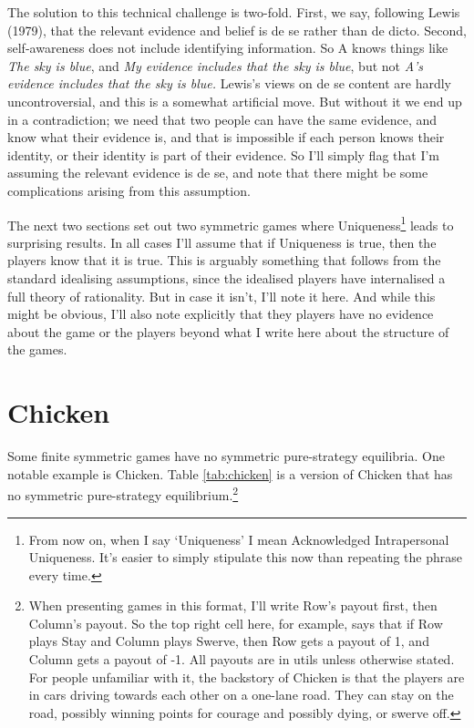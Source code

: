 \documentclass[
  11pt,
]{article}
\begin{document}
The solution to this technical challenge is two-fold. First, we say, following Lewis (1979), that the relevant evidence and belief is de se rather than de dicto. Second, self-awareness does not include identifying information. So A knows things like \emph{The sky is blue}, and \emph{My evidence includes that the sky is blue}, but not \emph{A's evidence includes that the sky is blue.} Lewis's views on de se content are hardly uncontroversial, and this is a somewhat artificial move. But without it we end up in a contradiction; we need that two people can have the same evidence, and know what their evidence is, and that is impossible if each person knows their identity, or their identity is part of their evidence. So I'll simply flag that I'm assuming the relevant evidence is de se, and note that there might be some complications arising from this assumption.

The next two sections set out two symmetric games where Uniqueness\footnote{From now on, when I say `Uniqueness' I mean Acknowledged Intrapersonal Uniqueness. It's easier to simply stipulate this now than repeating the phrase every time.} leads to surprising results. In all cases I'll assume that if Uniqueness is true, then the players know that it is true. This is arguably something that follows from the standard idealising assumptions, since the idealised players have internalised a full theory of rationality. But in case it isn't, I'll note it here. And while this might be obvious, I'll also note explicitly that they players have no evidence about the game or the players beyond what I write here about the structure of the games.

\hypertarget{chicken}{%
\section{Chicken}\label{chicken}}

Some finite symmetric games have no symmetric pure-strategy equilibria. One notable example is Chicken. Table \ref{tab:chicken} is a version of Chicken that has no symmetric pure-strategy equilibrium.\footnote{When presenting games in this format, I'll write Row's payout first, then Column's payout. So the top right cell here, for example, says that if Row plays Stay and Column plays Swerve, then Row gets a payout of 1, and Column gets a payout of -1. All payouts are in utils unless otherwise stated. For people unfamiliar with it, the backstory of Chicken is that the players are in cars driving towards each other on a one-lane road. They can stay on the road, possibly winning points for courage and possibly dying, or swerve off.}
\end{document}
